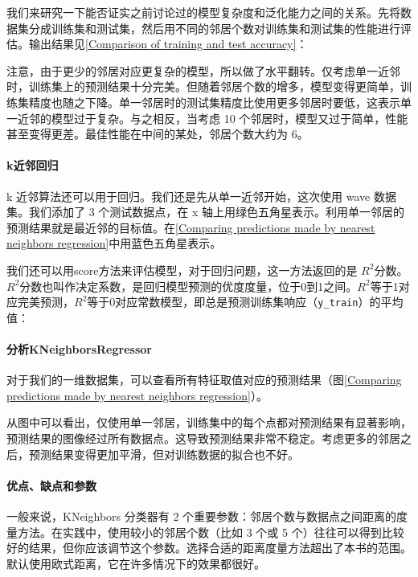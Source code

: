我们来研究一下能否证实之前讨论过的模型复杂度和泛化能力之间的关系。先将数据集分成训练集和测试集，然后用不同的邻居个数对训练集和测试集的性能进行评估。输出结果见\autoref{Comparison of training and test accuracy}：


注意，由于更少的邻居对应更复杂的模型，所以做了水平翻转。仅考虑单一近邻时，训练集上的预测结果十分完美。但随着邻居个数的增多，模型变得更简单，训练集精度也随之下降。单一邻居时的测试集精度比使用更多邻居时要低，这表示单一近邻的模型过于复杂。与之相反，当考虑 10 个邻居时，模型又过于简单，性能甚至变得更差。最佳性能在中间的某处，邻居个数大约为 6。

\paragraph{k近邻回归}

k 近邻算法还可以用于回归。我们还是先从单一近邻开始，这次使用 wave 数据集。我们添加了 3 个测试数据点，在 x 轴上用绿色五角星表示。利用单一邻居的预测结果就是最近邻的目标值。在\autoref{Comparing predictions made by nearest neighbors regression}中用蓝色五角星表示。

我们还可以用score方法来评估模型，对于回归问题，这一方法返回的是 $R^2$分数。$R^2$分数也叫作决定系数，是回归模型预测的优度度量，位于0到1之间。$R^2$等于1对应完美预测，$R^2$等于0对应常数模型，即总是预测训练集响应（\verb|y_train|）的平均值：


\paragraph{分析KNeighborsRegressor}
对于我们的一维数据集，可以查看所有特征取值对应的预测结果（图\autoref{Comparing predictions made by nearest neighbors regression}）。


从图中可以看出，仅使用单一邻居，训练集中的每个点都对预测结果有显著影响，预测结果的图像经过所有数据点。这导致预测结果非常不稳定。考虑更多的邻居之后，预测结果变得更加平滑，但对训练数据的拟合也不好。
\paragraph{优点、缺点和参数}

一般来说，KNeighbors 分类器有 2 个重要参数：邻居个数与数据点之间距离的度量方法。在实践中，使用较小的邻居个数（比如 3 个或 5 个）往往可以得到比较好的结果，但你应该调节这个参数。选择合适的距离度量方法超出了本书的范围。默认使用欧式距离，它在许多情况下的效果都很好。

